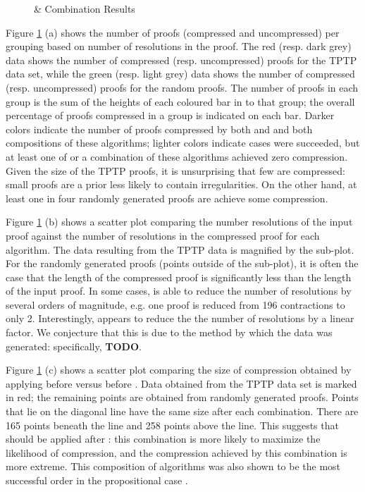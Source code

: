 {\begin{figure}[p]
 \caption{\GFOLU \& \FORPI Combination Results}
\label{fig:ex}

\end{figure}

Figure \ref{fig:ex} (a) shows the number of proofs (compressed and uncompressed) per grouping based on number of resolutions in the proof. The red (resp. dark grey) data shows the number of compressed (resp. uncompressed) proofs for the TPTP data set, while the green (resp. light grey) data shows the number of compressed (resp. uncompressed) proofs for the random proofs. The number of proofs in each group is the sum of the heights of each coloured bar in to that group; the overall percentage of proofs compressed in a group is indicated on each bar. Darker colors indicate the number of proofs compressed by both {\FORPI} and {\GFOLU} and both compositions of these algorithms; lighter colors indicate cases were {\FORPI} succeeded, but at least one of {\GFOLU} or a combination of these algorithms achieved zero compression. 
Given the size of the TPTP proofs, it is unsurprising that few are compressed: small proofs are a prior less likely to contain irregularities. On the other hand, at least one in four randomly generated proofs are achieve some compression. 

Figure \ref{fig:ex} (b) shows a scatter plot comparing the number resolutions of the input proof against the number of resolutions in the compressed proof for each algorithm. The data resulting from the TPTP data is magnified by the sub-plot. For the randomly generated proofs (points outside of the sub-plot), it is often the case that the length of the compressed proof is significantly less than the length of the input proof. In some cases, {\FORPI} is able to reduce the number of resolutions by several orders of magnitude, e.g. one proof is reduced from 196 contractions to only 2. Interestingly, {\GFOLU} appears to reduce the the number of resolutions by a linear factor. We conjecture that this is due to the method by which the data was generated: specifically, {\bf TODO}.

Figure \ref{fig:ex} (c) shows a scatter plot comparing the size of compression obtained by applying {\FORPI} before {\GFOLU} versus {\GFOLU} before {\FORPI}. Data obtained from the TPTP data set is marked in red; the remaining points are obtained from randomly generated proofs. Points that lie on the diagonal line have the same size after each combination. There are 165 points beneath the line and 258 points above the line. This suggests that {\FORPI} should be applied after {\GFOLU}: this combination is more likely to maximize the likelihood of compression, and the compression achieved by this combination is more extreme. This composition of algorithms was also shown to be the most successful order in the propositional case \cite{LURPI}.

}
